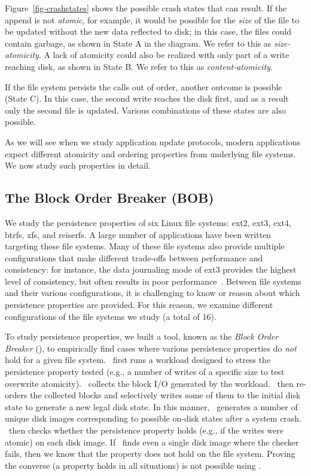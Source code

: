 Figure~\ref{fig-crashstates} shows the possible crash states that can result.
If the append is not {\em atomic}, for example, it would be possible for the
{\em size} of the file to be updated without the new data reflected to disk; in
this case, the files could contain garbage, as shown in State A in the diagram.
We refer to this as \textit{size-atomicity}. A lack of atomicity could also be
realized with only part of a write reaching disk, as shown in State B. We refer
to this as \textit{content-atomicity}.

If the file system persists the calls out of order, another outcome is possible (State
C). In this case, the second write reaches the disk first, and as a result
only the second file is updated. Various combinations of these states are also
possible.

As we will see when we study application update protocols, modern applications
expect different atomicity and ordering properties from underlying file
systems. We now study such properties in detail.

\subsection{The Block Order Breaker (BOB)}
\label{sec-fs-properties}

We study the persistence properties of six Linux file systems: ext2, ext3,
ext4, btrfs, xfs, and reiserfs. A large number of applications have been
written targeting these file systems. Many of these file systems also provide
multiple configurations that make different trade-offs between performance and
consistency: for instance, the data journaling mode of ext3 provides the
highest level of consistency, but often results in poor
performance~\cite{PrabhakaranEtAl05-Usenix}.  Between file systems and their
various configurations, it is challenging to know or reason about which
persistence properties are provided.  For this reason, we examine different
configurations of the file systems we study (a total of 16).

To study persistence properties, we built a tool, known as the
\textit{Block Order Breaker} (\fstoolname), to empirically find cases where
various persistence properties do {\em not} hold for a given file system.
\fstoolname\ first runs a workload designed to stress the persistence property
tested (e.g., a number of writes of a specific size to test overwrite
atomicity).  \fstoolname\ collects the block I/O generated by the
workload. \fstoolname\ then re-orders the collected blocks and selectively
writes some of them to the initial disk state to generate a new legal disk state. In
this manner, \fstoolname\ generates a number of unique disk images
corresponding to possible on-disk states after a system crash.
\fstoolname\ then checks whether the persistence property holds (e.g., if the
writes were atomic) on each disk image. If \fstoolname\ finds even a single
disk image where the checker fails, then we know that the property does not
hold on the file system. Proving the converse (a property holds in all
situations) is not possible using \fstoolname.

